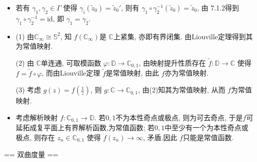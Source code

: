 \begin{itemize}
    \item[7.2.4] 若有 $\gamma_1,\gamma_2 \in \Gamma$
    使得 $\gamma_i(\tilde{z}_0) = \tilde{z}_0'$, 
    则有 $\gamma_1 \circ \gamma_2^{-1}(\tilde{z}_0) = \tilde{z}_0$,
    由 7.1.2得到 $\gamma_1 \circ \gamma_2^{-1}=\text{id}$,
    即 $\gamma_1 =\gamma_2$.

    \item[7.2.5] (1) 由$\mathbb{C}_\infty \cong \mathbb{S}^2$, 
    知 $f(\mathbb{C}_\infty)$是 $\mathbb{C}$上紧集, 亦即有界闭集. 
    由Liouville定理得到其为常值映射.
    
    (2) 由 $\mathbb{C}$单连通, 可取模函数 $\varphi:\mathbb{D}\to \mathbb{C}_{0,1}$, 
    由映射提升性质存在 $\tilde{f}:\mathbb{D}\to \mathbb{C}$
    使得 $f = \tilde{f}\circ \varphi$, 而由Liouville定理 $\tilde{f}$是常值映射,
    由此 $f$亦为常值映射.

    (3) 考虑 $g(z) = f(\frac{1}{z})$, 则 $g:\mathbb{C}\to \mathbb{C}_{0,1}$,
    由(2)知其为常值映射, 从而 $f$为常值映射.

    \item[7.2.6] 考虑解析映射 $f:\mathbb{C}_{0,1}\to \mathbb{D}$. 
    若$0,1$不为本性奇点或极点, 则为可去奇点, 于是$f$可延拓成复平面上有界解析函数,为常值函数;
    若$0,1$中至少有一个为本性奇点或极点, 则存在 $z_n \in \mathbb{C}_{0,1}$
    使得 $f(z_n)\to \infty$, 矛盾.因此 $f$只能是常值函数.
\end{itemize}

== 双曲度量 ==

